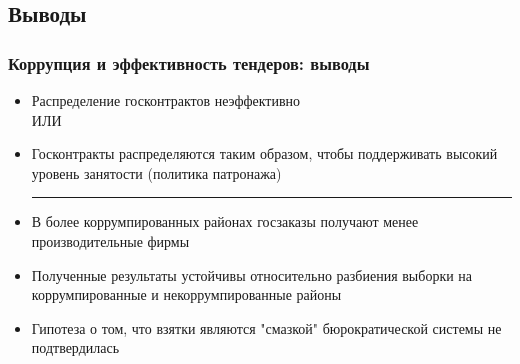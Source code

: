 \subsection{Выводы}
\begin{frame}
\frametitle{Коррупция и эффективность тендеров: выводы}
	\begin{itemize}
		\item Распределение госконтрактов неэффективно
		\\ИЛИ
		\item Госконтракты распределяются таким образом, чтобы поддерживать высокий уровень занятости (политика патронажа)
		\medskip\hrule\medskip
		\item В более коррумпированных районах госзаказы получают менее производительные фирмы
		\item Полученные результаты устойчивы относительно разбиения выборки на коррумпированные и некоррумпированные районы
		\item Гипотеза о том, что взятки являются "смазкой" бюрократической системы не подтвердилась
	\end{itemize}
\end{frame}
